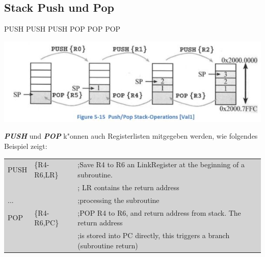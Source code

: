 \subsection{Stack Push und Pop}
\begin{multicols}{2}
    \begin{minipage}{3cm}
        PUSH \newline
        PUSH \newline
        PUSH \newline
        POP  \newline
        POP  \newline
        POP  \newline
    \end{minipage}
    \begin{minipage}{\linewidth}
        \includegraphics[width=1.5\linewidth]{images/stackpushpop}  
    \end{minipage}
\end{multicols}
 \textbf{\textit{PUSH}} und \textbf{\textit{POP}} k"onnen auch Registerlisten mitgegeben werden, wie folgendes Beispiel zeigt:
 
 \colorbox{lightgray}{
    \begin{tabular}{lll}
        PUSH   & \{R4-R6,LR\}  & ;Save R4 to R6 an LinkRegister at the beginning of a subroutine.\\ 
        && ; LR contains the return address\\
        ...   &   & ;processing the subroutine\\ 
        POP & \{R4-R6,PC\} & ;POP R4 to R6, and return address from stack. The return address\\
        && ;is stored into PC directly, this triggers a branch (subroutine return)
    \end{tabular} }


